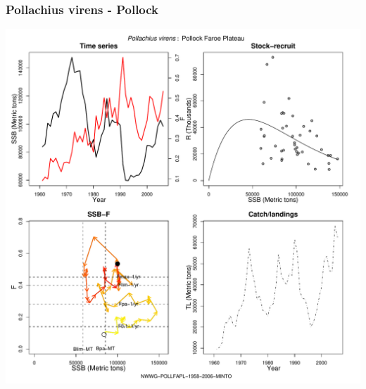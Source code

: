 \subsubsection{Pollachius virens - Pollock}
\begin{center}
\includegraphics[width=1.2\textwidth]{../R/figures/NWWG-POLLFAPL-1958-2006-MINTO.pdf}
\end{center}

